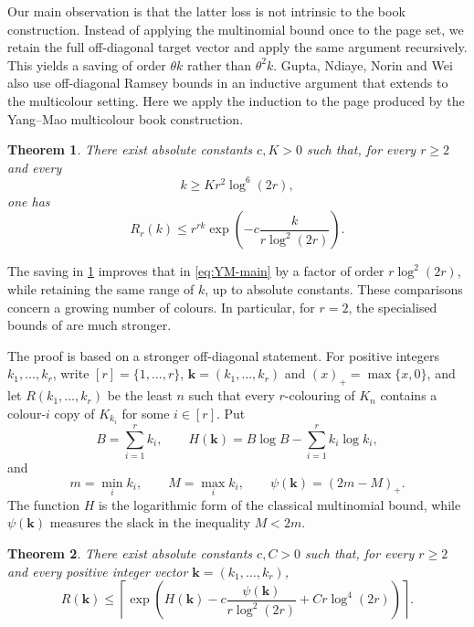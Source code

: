 \documentclass[11pt]{article}
\newtheorem{theorem}{Theorem}[section]
\theoremstyle{definition}
\newcommand{\kk}{\mathbf k}
\newcommand{\Ent}{H}
\newcommand{\pot}{\psi}
\begin{document}
Our main observation is that the latter loss is not intrinsic to the book
construction.  Instead of applying the multinomial bound once to the page
set, we retain the full off-diagonal target vector and apply the same argument
recursively.  This yields a saving of order $\theta k$ rather than
$\theta^2k$.  Gupta, Ndiaye, Norin and Wei~\cite{GNNW} also use off-diagonal
Ramsey bounds in an inductive argument that extends to the multicolour
setting.  Here we apply the induction to the page produced by the Yang--Mao
multicolour book construction.

\begin{theorem}\label{thm:main}
There exist absolute constants $c,K>0$ such that, for every $r\ge2$ and every
\[
 k\ge K r^2\log^6(2r),
\]
one has
\[
 R_r(k)\le
 r^{rk}\exp\!\left(-c\frac{k}{r\log^2(2r)}\right).
\]
\end{theorem}

The saving in \cref{thm:main} improves that in \eqref{eq:YM-main} by a factor
of order $r\log^2(2r)$, while retaining the same range of $k$, up to
absolute constants.  These comparisons
concern a growing number of colours.  In particular, for $r=2$, the
specialised bounds of \cite{CGMS,GNNW} are much stronger.

The proof is based on a stronger off-diagonal statement.  For positive
integers $k_1,\ldots,k_r$, write $[r]=\{1,\ldots,r\}$,
$\kk=(k_1,\ldots,k_r)$ and $(x)_+=\max\{x,0\}$, and let $R(k_1,\ldots,k_r)$
be the least $n$ such that every $r$-colouring of $K_n$ contains a
colour-$i$ copy of $K_{k_i}$ for some $i\in[r]$.  Put
\begin{equation}\label{eq:entropy-def-intro}
 B=\sum_{i=1}^r k_i,
 \qquad
 \Ent(\kk)=B\log B-\sum_{i=1}^r k_i\log k_i,
\end{equation}
and
\[
 m=\min_i k_i,\qquad M=\max_i k_i,
 \qquad \pot(\kk)=(2m-M)_+.
\]
The function $\Ent$ is the logarithmic form of the classical multinomial bound,
while $\pot(\kk)$ measures the slack in the inequality $M<2m$.

\begin{theorem}\label{thm:offdiag}
There exist absolute constants $c,C>0$ such that, for every $r\ge2$ and every
positive integer vector $\kk=(k_1,\ldots,k_r)$,
\begin{equation}\label{eq:offdiag}
 R(\kk)\le
 \left\lceil
 \exp\!\left(
 \Ent(\kk)
 -c\frac{\pot(\kk)}{r\log^2(2r)}
 +Cr\log^4(2r)
 \right)
 \right\rceil.
\end{equation}
\end{theorem}
\end{document}
